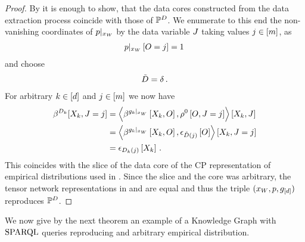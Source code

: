 \begin{proof}
    By  it is enough to show, that the data cores constructed from the data extraction process coincide with those of $\mathbb{P}^{D}$.
    We enumerate to this end the non-vanishing coordinates of ${p}|_{x_{W}}$ by the data variable $J$ taking values $j\in[m]$, as
    \begin{align*}
        {p}|_{x_{W}} \left[O=j\right] = 1 \,
    \end{align*}
    and choose
    \begin{align*}
        \tilde{D} = \delta \, .
    \end{align*}
    For arbitrary $k\in[d]$ and $j\in[m]$ we now have
    \begin{align*}
        \beta^{D_{k}}[X_{k},J=j]
        &= \left\langle 
            \beta^{{g_{k}}|_{x_{W}}}\left[X_{k},O\right],
            \rho^{0}\left[O,J=j\right]
        \right\rangle \left[ X_{k},J \right] \\
        &= \left\langle 
            \beta^{{g_{k}}|_{x_{W}}}\left[X_{k},O\right],
            \epsilon_{\tilde{D}(j)}\left[O\right]
        \right\rangle \left[ X_{k},J=j \right] \\
        &= \epsilon_{D_k(j)}\left[X_{k}\right] \, .
    \end{align*}
    This coincides with the slice of the data core of the CP representation of empirical distributions used in .
    Since the slice and the core was arbitrary, the tensor network representations in  and  are equal and thus the triple $(x_{W},p,g_{[d]})$ reproduces $\mathbb{P}^{D}$.
\end{proof}


We now give by the next theorem an example of a Knowledge Graph with $\mathrm{SPARQL}$ queries reproducing and arbitrary empirical distribution.

